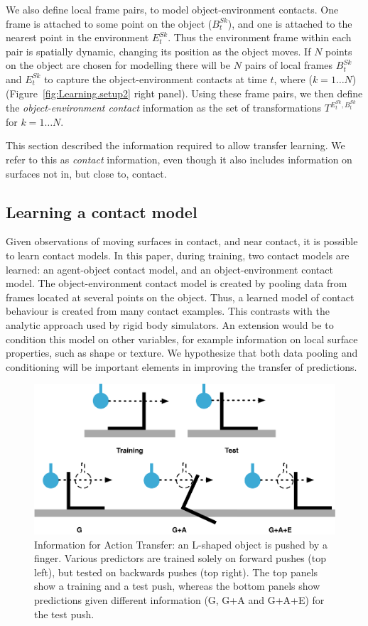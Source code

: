 We also define local frame pairs, to model object-environment contacts. One frame is attached to some point on the object ($B^{Sk}_t$), and one is attached to the nearest point in the environment $E^{Sk}_t$.  Thus the environment frame within each pair is spatially dynamic, changing its position as the object moves. If $N$ points on the object are chosen for modelling there will be $N$ pairs of local frames $B^{Sk}_t$ and $E^{Sk}_t$ to capture the object-environment contacts at time $t$, where ($k=1 \ldots N$) (Figure~\ref{fig:Learning.setup2} right panel). Using these frame pairs, we then define the \textit{object-environment contact} information as the set of transformations $T^{E^{Sk}_t,B^{Sk}_t}$ for $k=1 \ldots N$. 

This section described the information required to allow transfer learning. We refer to this as {\em contact} information, even though it also includes information on surfaces not in, but close to, contact. 

\subsection{Learning a contact model}
Given observations of moving surfaces in contact, and near contact, it is possible to learn contact models. In this paper, during training, two contact models are learned: an agent-object contact model, and an object-environment contact model. The object-environment contact model is created by pooling data from frames located at several points on the object. Thus, a learned model of contact behaviour is created from many contact examples. This contrasts with the analytic approach used by rigid body simulators. An extension would be to condition this model on other variables, for example information on local surface properties, such as shape or texture. We hypothesize that both data pooling and conditioning will be important elements in improving the transfer of predictions. 

\begin{figure}[t]
\centerline{\includegraphics[width=\columnwidth]{BackPushToyExample}}
\caption[ToyExample]{Information for Action Transfer: an L-shaped object is pushed by a finger. Various predictors are trained solely on forward pushes (top left), but tested on backwards pushes (top right). The top panels show a training and a test push, whereas the bottom panels show predictions given different information (G, G+A and G+A+E) for the test push.}
\label{fig:ToyExample}
\end{figure}

